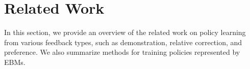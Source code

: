\section{Related Work}
\label{sec:related_work}
In this section, we provide an overview of the related work on policy learning from various feedback types, such as demonstration, relative correction, and preference.
We also summarize methods for training policies represented by EBMs.

